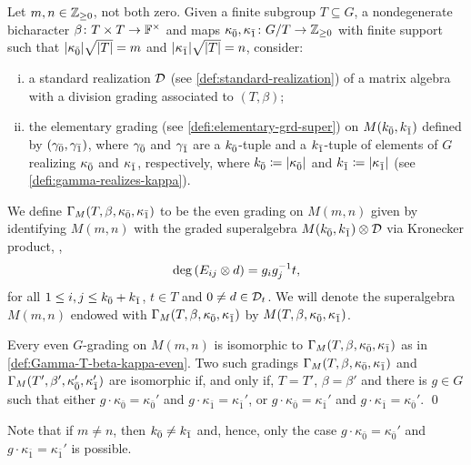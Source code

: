 \begin{defi}\label{def:Gamma-T-beta-kappa-even}
    Let $m, n\in \mathbb{Z}_{\geq 0}$, not both zero. 
    Given a finite subgroup $T \subseteq G$, a nondegenerate bicharacter $\beta\colon T\times T \to \mathbb{F}^\times$ and maps $\kappa_{\bar{0}}, \kappa_{\bar{1}} \colon G/T \to \mathbb{Z}_{\geq 0}$ with finite support such that $|\kappa_{\bar{0}}| \sqrt{|T|} = m$ and $|\kappa_{\bar{1}}| \sqrt{|T|} = n$, consider:
    \begin{enumerate}[(i)]
        \item a standard realization $\mathcal{D}$ (see \cref{def:standard-realization}) of a matrix algebra with a division grading associated to $(T,\beta)$;
        \item the elementary grading (see \cref{defi:elementary-grd-super}) on $M(k_{\bar{0}}, k_{\bar{1}})$ defined by $(\gamma_{\bar{0}}, \gamma_{\bar{1}})$, where $\gamma_{\bar{0}}$ and $\gamma_{\bar{1}}$ are a $k_{\bar{0}}$-tuple and a $k_{\bar{1}}$-tuple of elements of $G$ realizing $\kappa_{\bar{0}}$ and $\kappa_{\bar{1}}$, respectively, where $k_{\bar{0}} \coloneqq |\kappa_{\bar{0}}|$ and $k_{\bar{1}} \coloneqq |\kappa_{\bar{1}}|$  (see \cref{defi:gamma-realizes-kappa}).
    \end{enumerate}
    We define $\Gamma_M (T, \beta, \kappa_{\bar{0}}, \kappa_{\bar{1}})$ to be the even grading on $M(m,n)$ given by identifying $M(m,n)$ with the graded superalgebra $M(k_{\bar{0}}, k_{\bar{1}}) \otimes \mathcal{D}$ via Kronecker product, \ie,
    \[
        \deg \left( E_{ij} \otimes d \right) = g_ig_j^{-1} t,
    \] 
    for all $1\leq i, j \leq k_{\bar{0}} + k_{\bar{1}}$, $t\in T$ and $0 \neq d \in \mathcal{D}_t$. 
    We will denote the superalgebra $M(m,n)$ endowed with $\Gamma_M (T, \beta, \kappa_{\bar{0}}, \kappa_{\bar{1}})$ by $M(T, \beta, \kappa_{\bar{0}}, \kappa_{\bar{1}})$. 
\end{defi}

\begin{cor}\label{cor:iso-M-even}
    Every even $G$-grading on $M(m,n)$ is isomorphic to $\Gamma_M (T, \beta, \kappa_{\bar{0}}, \kappa_{\bar{1}})$ as in \cref{def:Gamma-T-beta-kappa-even}. 
    Two such gradings $\Gamma_M (T, \beta, \kappa_{\bar{0}}, \kappa_{\bar{1}})$ and $\Gamma_M (T', \beta', \kappa_{\bar{0}}', \kappa_{\bar{1}}')$ are isomorphic if, and only if, $T = T'$, $\beta = \beta'$ and there is $g\in G$ such that either $g \cdot \kappa_{\bar 0}=\kappa_{\bar 0}'$ and $g \cdot \kappa_{\bar 1}=\kappa_{\bar 1}'$, or $g \cdot \kappa_{\bar 0}=\kappa_{\bar 1}'$ and $g \cdot \kappa_{\bar 1}=\kappa_{\bar 0}'$.  \qed
\end{cor}

Note that if $m \neq n$, 
then $k_{\bar{0}} \neq k_{\bar{1}}$ and, hence, only the case $g \cdot \kappa_{\bar 0}=\kappa_{\bar 0}'$ and $g \cdot \kappa_{\bar 1}=\kappa_{\bar 1}'$ is possible.

